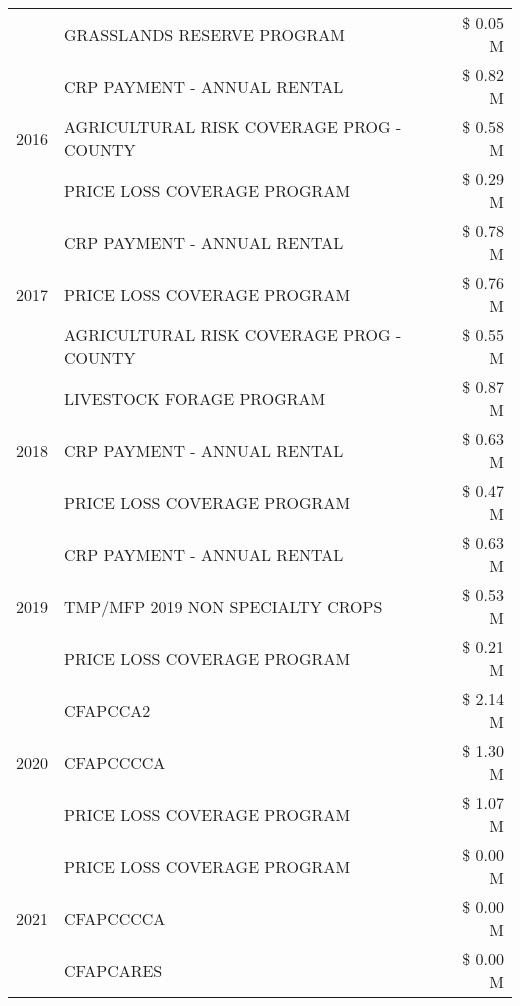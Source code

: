 \begin{tabular}{llr}
 & GRASSLANDS RESERVE PROGRAM & \$ 0.05 M \\
\cline{1-3}
\multirow[t]{3}{*}{2016} & CRP PAYMENT - ANNUAL RENTAL & \$ 0.82 M \\
 & AGRICULTURAL RISK COVERAGE PROG - COUNTY & \$ 0.58 M \\
 & PRICE LOSS COVERAGE PROGRAM & \$ 0.29 M \\
\cline{1-3}
\multirow[t]{3}{*}{2017} & CRP PAYMENT - ANNUAL RENTAL & \$ 0.78 M \\
 & PRICE LOSS COVERAGE PROGRAM & \$ 0.76 M \\
 & AGRICULTURAL RISK COVERAGE PROG - COUNTY & \$ 0.55 M \\
\cline{1-3}
\multirow[t]{3}{*}{2018} & LIVESTOCK FORAGE PROGRAM & \$ 0.87 M \\
 & CRP PAYMENT - ANNUAL RENTAL & \$ 0.63 M \\
 & PRICE LOSS COVERAGE PROGRAM & \$ 0.47 M \\
\cline{1-3}
\multirow[t]{3}{*}{2019} & CRP PAYMENT - ANNUAL RENTAL & \$ 0.63 M \\
 & TMP/MFP 2019 NON SPECIALTY CROPS & \$ 0.53 M \\
 & PRICE LOSS COVERAGE PROGRAM & \$ 0.21 M \\
\cline{1-3}
\multirow[t]{3}{*}{2020} & CFAPCCA2 & \$ 2.14 M \\
 & CFAPCCCCA & \$ 1.30 M \\
 & PRICE LOSS COVERAGE PROGRAM & \$ 1.07 M \\
\cline{1-3}
\multirow[t]{3}{*}{2021} & PRICE LOSS COVERAGE PROGRAM & \$ 0.00 M \\
 & CFAPCCCCA & \$ 0.00 M \\
 & CFAPCARES & \$ 0.00 M \\
\cline{1-3}
\bottomrule
\end{tabular}
